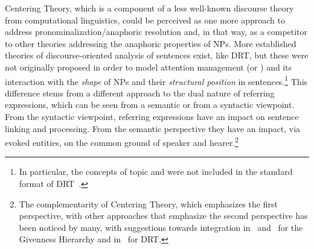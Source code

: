 \documentclass[output=paper
,modfonts
,nonflat]{langsci/langscibook}
\begin{document}
Centering Theory, which is a component of a less well-known discourse theory from computational linguistics, could be perceived as one more approach to address pronominalization/anaphoric resolution and, in that way, as a competitor to other theories addressing the anaphoric properties of NPs. More established theories of discourse-oriented analysis of sentences exist, like DRT, but these were not originally proposed in order to model attention management (or ) and its interaction with the \textit{shape} of NPs and their \textit{structural position} in sentences.\footnote{In particular, the concepts of topic and  were not included in the standard format of DRT~\citep[see][360, 639]{KampReyle1993}.} This difference stems from a different approach to the dual nature of referring expressions, which can be seen from a semantic or from a syntactic viewpoint. From the syntactic viewpoint, referring expressions have an impact on sentence linking and processing. From the semantic perspective they have an impact, via evoked entities, on the common ground of speaker and hearer.\footnote{The complementarity of Centering Theory, which emphasizes the first perspective, with other approaches that emphasize the second perspective has been noticed by many, with suggestions towards integration in~\citet{WalkerPrince1996} and~\citet{Gundel1998} for the Givenness Hierarchy and in~\citet{Roberts1998place,Roberts2012} for DRT.}\largerpage[1.75] 
\end{document}
